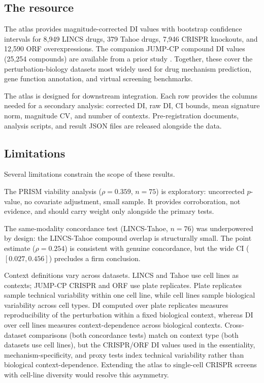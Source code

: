 \documentclass[11pt]{article}
\begin{document}
\subsection{The resource}

The atlas provides magnitude-corrected DI values with bootstrap
confidence intervals for 8{,}949 LINCS drugs, 379 Tahoe drugs, 7{,}946
CRISPR knockouts, and 12{,}590 ORF overexpressions.  The companion JUMP-CP
compound DI values (25{,}254 compounds) are available from a prior
study \citep{tower2026confound}.  Together, these cover the
perturbation-biology datasets most widely used for drug mechanism
prediction, gene function annotation, and virtual screening
benchmarks.

The atlas is designed for downstream integration.  Each row provides the
columns needed for a secondary analysis: corrected DI, raw DI, CI
bounds, mean signature norm, magnitude CV, and number of contexts.
Pre-registration documents, analysis scripts, and result JSON files are
released alongside the data.

\subsection{Limitations}

Several limitations constrain the scope of these results.

The PRISM viability analysis ($\rho = 0.359$, $n = 75$) is exploratory:
uncorrected $p$-value, no covariate adjustment, small sample.  It
provides corroboration, not evidence, and should carry weight only
alongside the primary tests.

The same-modality concordance test (LINCS-Tahoe, $n = 76$) was underpowered by design: the
LINCS-Tahoe compound overlap is structurally small.  The point estimate
($\rho = 0.254$) is consistent with genuine concordance, but the wide CI
($[0.027, 0.456]$) precludes a firm conclusion.

Context definitions vary across datasets.  LINCS and Tahoe use cell
lines as contexts; JUMP-CP CRISPR and ORF use plate replicates.  Plate
replicates sample technical variability within one cell line, while cell
lines sample biological variability across cell types.  DI computed over
plate replicates measures reproducibility of the perturbation within a
fixed biological context, whereas DI over cell lines measures
context-dependence across biological contexts.  Cross-dataset
comparisons (both concordance tests) match on context type (both
datasets use cell lines), but the CRISPR/ORF DI values used in the
essentiality, mechanism-specificity, and proxy tests index technical
variability rather than biological
context-dependence.  Extending the atlas to single-cell CRISPR screens
with cell-line diversity \citep{tahoe2025} would resolve this
asymmetry.
\end{document}
